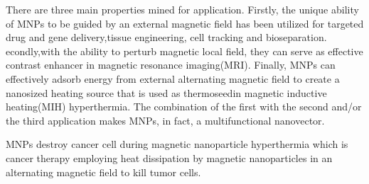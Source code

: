 \documentclass[10pt,a4paper]{article}
\begin{document}
\begin{multicols}{2}
There are three main properties mined for application. Firstly, the unique ability of MNPs to be guided by an external magnetic field has been utilized for targeted drug and gene delivery,tissue engineering, cell tracking and bioseparation. 
econdly,with the ability to perturb magnetic local field, they can serve as effective contrast enhancer in magnetic resonance imaging(MRI). Finally, MNPs can effectively adsorb energy from external alternating magnetic field to create a nanosized heating source that is used as thermoseedin magnetic inductive heating(MIH) hyperthermia. The combination of the first with  the second and/or the third application makes MNPs, in fact, a multifunctional nanovector\cite{2}. 

MNPs destroy cancer cell during magnetic nanoparticle hyperthermia which is cancer therapy employing heat dissipation by magnetic nanoparticles in an alternating magnetic field to kill tumor cells. 




\end{multicols}
\end{document}
